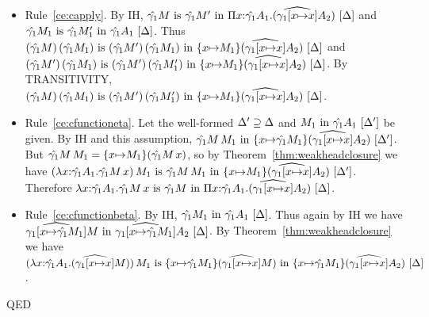 \documentclass{article}
\theoremstyle{break}
\newcommand{\qed}{\mbox{QED}}
\newcommand{\env}{\gamma}
\newenvironment{proof}{\noindent{\bf Proof:}\hspace*{0.5em}}{\hspace*{\fill}\qed}
\begin{document}
\begin{proof}
\begin{itemize}
\item Rule~\ref{ce:capply}.
By IH, 
$\semanticequivterm{\world}{\envone\constructor}{\envone\constructor'}
    {\kpi{\cvar}{\envone\kind_1}{(\envonex\kind_2)}}$ and
$\semanticequivterm{\world}{\envone\constructor_1}{\envone\constructor'_1}{\envone\kind_1}$.
Thus
$\semanticequivterm{\world}{\capply{(\envone\constructor)}{(\envone\constructor_1)}}
    {\capply{(\envone\constructor')}{(\envone\constructor_1)}}
    {\substitute{\cvar}{\constructor_1}{(\envonex\kind_2)}}$ and
$\semanticequivterm{\world}{\capply{(\envone\constructor')}{(\envone\constructor_1)}}
    {\capply{(\envone\constructor')}{(\envone\constructor'_1)}}
    {\substitute{\cvar}{\constructor_1}{(\envonex\kind_2)}}$.
By TRANSITIVITY,
$\semanticequivterm{\world}{\capply{(\envone\constructor)}{(\envone\constructor_1)}}
    {\capply{(\envone\constructor')}{(\envone\constructor'_1)}}
    {\substitute{\cvar}{\constructor_1}{(\envonex\kind_2)}}$.

\item Rule~\ref{ce:cfunctioneta}.
Let the well-formed $\Delta'\supseteq\Delta$ and
$\semanticvalidterm{\world'}{\constructor_1}{\envone\kind_1}$ be given.
By IH and this assumption,
$\semanticvalidterm{\world'}{\capply{\envone\constructor}{\constructor_1}}
    {\substitute{\cvar}{\envone\constructor_1}{(\envonex\kind_2)}}$.
But
$\capply{\envone\constructor}{\constructor_1} = 
    \substitute{\cvar}{\constructor_1}{(\capply{\envone\constructor}{\cvar})}$,
so by Theorem~\ref{thm:weakheadclosure} we have
$\semanticequivterm{\world'}
   {\capply{(\cfunction{\cvar}{\envone\kind_1}{\capply{\envone\constructor}{\cvar}})}{\constructor_1}}
   {\capply{\envone\constructor}{\constructor_1}}
   {\substitute{\cvar}{\constructor_1}{(\envonex\kind_2)}}$.
Therefore
$\semanticequivterm{\world}{\cfunction{\cvar}{\envone\kind_1}{\capply{\envone\constructor}{\cvar}}}
   {\envone\constructor}
   {\kpi{\cvar}{\envone\kind_1}{(\envonex\kind_2)}}$.

\item Rule~\ref{ce:cfunctionbeta}.
By IH,
$\semanticvalidterm{\world}{\envone\constructor_1}{\envone\kind_1}$.
Thus again by IH we have
$\semanticvalidterm{\world}{\widehat{\env_1[\cvar{\mapsto}{\envone\constructor_1}]}\constructor}
   {\widehat{\env_1[\cvar{\mapsto}{\envone\constructor_1}]}\kind_2}$.
By Theorem~\ref{thm:weakheadclosure} we have
$\semanticequivterm{\world}
   {\capply{(\cfunction{\cvar}{\envone\kind_1}{(\envonex\constructor)})}{\constructor_1}}
   {\substitute{\cvar}{\envone\constructor_1}(\envonex\constructor)}
   {\substitute{\cvar}{\envone\constructor_1}{(\envonex\kind_2)}}$.


\end{itemize}
\end{proof}
\end{document}
